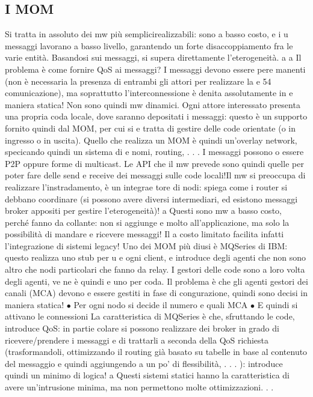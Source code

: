 \subsection{I MOM}
Si tratta in assoluto dei mw più semplicirealizzabili: sono a basso costo, e i
u
messaggi lavorano a basso livello, garantendo un forte disaccoppiamento fra le
varie entità. Basandosi sui messaggi, si supera direttamente l'eterogeneità.
a
a
Il problema è come fornire QoS ai messaggi? I messaggi devono essere pere
manenti (non è necessaria la presenza di entrambi gli attori per realizzare la
e
54
comunicazione), ma soprattutto l'interconnessione è denita assolutamente in
e
maniera statica! Non sono quindi mw dinamici.
Ogni attore interessato presenta una propria coda locale, dove saranno depositati i messaggi: questo è un supporto
fornito quindi dal MOM, per cui si
e
tratta di gestire delle code orientate (o in ingresso o in uscita). Quello che realizza un MOM è quindi un'overlay
network, specicando quindi un sistema di
e
nomi, routing, . . .
I messaggi possono o essere P2P oppure forme di multicast. Le API che il
mw prevede sono quindi quelle per poter fare delle send e receive dei messaggi
sulle code locali!Il mw si preoccupa di realizzare l'instradamento, è un integrae
tore di nodi: spiega come i router si debbano coordinare (si possono avere diversi
intermediari, ed esistono messaggi broker appositi per gestire l'eterogeneità)!
a
Questi sono mw a basso costo, perché fanno da collante: non si aggiunge
e
molto all'applicazione, ma solo la possibilità di mandare e ricevere messaggi! Il
a
costo limitato facilita infatti l'integrazione di sistemi legacy!
Uno dei MOM più diusi è MQSeries di IBM: questo realizza uno stub per
u
e
ogni client, e introduce degli agenti che non sono altro che nodi particolari che
fanno da relay. I gestori delle code sono a loro volta degli agenti, ve ne è quindi
e
uno per coda. Il problema è che gli agenti gestori dei canali (MCA) devono
e
essere gestiti in fase di congurazione, quindi sono decisi in maniera statica!
$\bullet$ Per ogni nodo si decide il numero e quali MCA
$\bullet$ E quindi si attivano le connessioni
La caratteristica di MQSeries è che, sfruttando le code, introduce QoS: in partie
colare si possono realizzare dei broker in grado di ricevere/prendere i messaggi e
di trattarli a seconda della QoS richiesta (trasformandoli, ottimizzando il routing già basato su tabelle in base al
contenuto del messaggio e quindi aggiungendo
a
un po' di flessibilità, . . . ): introduce quindi un minimo di logica!
a
Questi sistemi statici hanno la caratteristica di avere un'intrusione minima,
ma non permettono molte ottimizzazioni. . .
